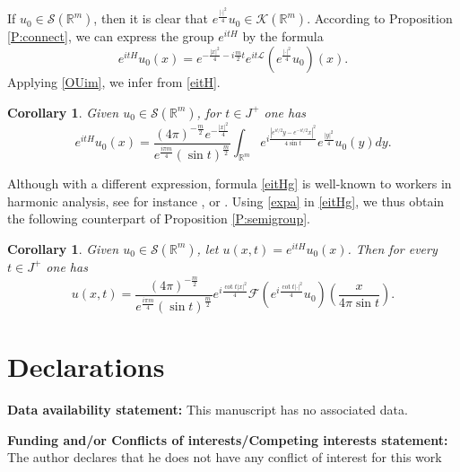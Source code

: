 \documentclass[11pt,a4paper]{amsart}
\def \So {\mathscr{S}(\Rm)}
\newcommand{\Rm}{\mathbb R^m}
\numberwithin{equation}{section}
\newtheorem{corollary}[theorem]{Corollary}
\numberwithin{equation}{section}
\begin{document}
If $u_0\in \So$, then it is clear that $e^{\frac{|\cdot|^2}4} u_0\in \mathscr K(\Rm)$. According to Proposition \ref{P:connect}, we can express the group $e^{itH}$ by the formula
\begin{equation}\label{eitH}
e^{itH} u_0(x) = e^{-\frac{|x|^2}4 - i \frac m2 t} e^{it\mathscr L}(e^{\frac{|\cdot|^2}4} u_0)(x).
\end{equation}
Applying \eqref{OUim}, we infer from \eqref{eitH}.

\begin{corollary}\label{C:HOim}
Given $u_0\in \So$, for $t\in J^+$ one has
\begin{equation}\label{eitHg}
e^{itH} u_0(x) =  \frac{(4\pi
)^{-\frac{m}{2}} e^{-\frac{|x|^2}4}}{e^{\frac{i\pi m}{4}} (\sin t)^{\frac m2}} \int_{\Rm} e^{i \frac{|e^{it/2} y-e^{-it/2} x|^2}{4 \sin t}} e^{\frac{|y|^2}4} u_0(y) dy.
\end{equation}
\end{corollary}
Although with a different expression, formula \eqref{eitHg} is well-known to workers in harmonic analysis, see for instance \cite[Eq. (4.13), p.85]{Vel1}, or \cite[Eq. (6), p.164]{ST}.
Using \eqref{expa} in \eqref{eitHg}, we thus obtain the following counterpart of Proposition \ref{P:semigroup}.

\begin{corollary}\label{C:semigroup}
Given $u_0\in \mathscr S(\Rm)$, let $u(x,t) = e^{itH}u_0(x)$. Then for every $t\in J^+$ one has
\begin{equation}\label{finalino}
u(x,t) =  \frac{(4\pi
)^{-\frac{m}{2}}}{e^{\frac{i\pi m}{4}} (\sin t)^{\frac m2}} e^{i \frac{\cot t |x|^2}{4}} \mathscr F\left(e^{i \frac{\cot t |\cdot|^2}4} u_0\right)(\frac{x}{4 \pi \sin t}).
\end{equation}
\end{corollary} 



\vskip 0.2in

\section{Declarations}

\noindent \textbf{Data availability statement:} This manuscript has no associated data.

\vskip 0.2in

\noindent \textbf{Funding and/or Conflicts of interests/Competing interests statement:} The author declares that he does not have any conflict of interest for this work
\end{document}
